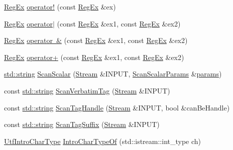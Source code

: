 \begin{DoxyCompactItemize}
\item 
\mbox{\hyperlink{class_y_a_m_l_1_1_reg_ex}{Reg\+Ex}} \mbox{\hyperlink{namespace_y_a_m_l_a1e1f522940ab0016a28e1969ba4846c2}{operator!}} (const \mbox{\hyperlink{class_y_a_m_l_1_1_reg_ex}{Reg\+Ex}} \&ex)
\item 
\mbox{\hyperlink{class_y_a_m_l_1_1_reg_ex}{Reg\+Ex}} \mbox{\hyperlink{namespace_y_a_m_l_a952d789a7eee50a875acb0dd53ad60d4}{operator$\vert$}} (const \mbox{\hyperlink{class_y_a_m_l_1_1_reg_ex}{Reg\+Ex}} \&ex1, const \mbox{\hyperlink{class_y_a_m_l_1_1_reg_ex}{Reg\+Ex}} \&ex2)
\item 
\mbox{\hyperlink{class_y_a_m_l_1_1_reg_ex}{Reg\+Ex}} \mbox{\hyperlink{namespace_y_a_m_l_a1106e76b39439866501b83aa84de5573}{operator \&}} (const \mbox{\hyperlink{class_y_a_m_l_1_1_reg_ex}{Reg\+Ex}} \&ex1, const \mbox{\hyperlink{class_y_a_m_l_1_1_reg_ex}{Reg\+Ex}} \&ex2)
\item 
\mbox{\hyperlink{class_y_a_m_l_1_1_reg_ex}{Reg\+Ex}} \mbox{\hyperlink{namespace_y_a_m_l_ab85624cc9fa409be64dd6dbce0cdc458}{operator+}} (const \mbox{\hyperlink{class_y_a_m_l_1_1_reg_ex}{Reg\+Ex}} \&ex1, const \mbox{\hyperlink{class_y_a_m_l_1_1_reg_ex}{Reg\+Ex}} \&ex2)
\item 
\mbox{\hyperlink{glad_8h_ac83513893df92266f79a515488701770}{std\+::string}} \mbox{\hyperlink{namespace_y_a_m_l_a7379ec57fc0e2d7647f1dd7a0dc7ba1e}{Scan\+Scalar}} (\mbox{\hyperlink{class_y_a_m_l_1_1_stream}{Stream}} \&I\+N\+P\+UT, \mbox{\hyperlink{struct_y_a_m_l_1_1_scan_scalar_params}{Scan\+Scalar\+Params}} \&\mbox{\hyperlink{glad_8h_a04bebf9f1cf95222649f8f26b74c4d81}{params}})
\item 
const \mbox{\hyperlink{glad_8h_ac83513893df92266f79a515488701770}{std\+::string}} \mbox{\hyperlink{namespace_y_a_m_l_a33a2f180601529f6e4143a7f7302b922}{Scan\+Verbatim\+Tag}} (\mbox{\hyperlink{class_y_a_m_l_1_1_stream}{Stream}} \&I\+N\+P\+UT)
\item 
const \mbox{\hyperlink{glad_8h_ac83513893df92266f79a515488701770}{std\+::string}} \mbox{\hyperlink{namespace_y_a_m_l_a751d0c63168022fe1fba52f919fb843f}{Scan\+Tag\+Handle}} (\mbox{\hyperlink{class_y_a_m_l_1_1_stream}{Stream}} \&I\+N\+P\+UT, bool \&can\+Be\+Handle)
\item 
const \mbox{\hyperlink{glad_8h_ac83513893df92266f79a515488701770}{std\+::string}} \mbox{\hyperlink{namespace_y_a_m_l_a8d9ae9b29f649097b151c9368b526687}{Scan\+Tag\+Suffix}} (\mbox{\hyperlink{class_y_a_m_l_1_1_stream}{Stream}} \&I\+N\+P\+UT)
\item 
\mbox{\hyperlink{namespace_y_a_m_l_ae1a7736039063f2f0147bcc1633eeadb}{Utf\+Intro\+Char\+Type}} \mbox{\hyperlink{namespace_y_a_m_l_a505a93ae230ef18b9a1b2b7acdb56c87}{Intro\+Char\+Type\+Of}} (std\+::istream\+::int\+\_\+type ch)

\end{DoxyCompactItemize}
